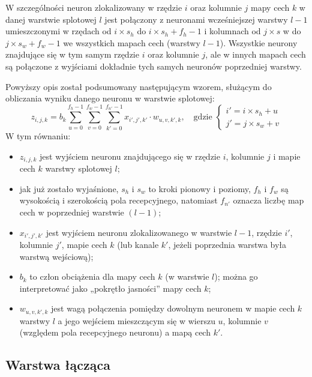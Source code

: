 \documentclass[12pt]{mwbk}
\theoremstyle{plain}
\theoremstyle{definition}
\theoremstyle{remark}
\begin{document}
W szczególności neuron zlokalizowany w rzędzie $i$ oraz kolumnie $j$ mapy cech $k$ w danej warstwie
splotowej $l$ jest połączony z neuronami wcześniejszej warstwy $l-1$ umieszczonymi w rzędach od $i\times s_h$
do $i\times s_h +f_h -1$ i kolumnach od $j\times s$ w do $j\times s_w +f_w -1$ we wszystkich mapach cech (warstwy $l-1$). Wszystkie neurony znajdujące się w tym samym rzędzie $i$ oraz kolumnie $j$, ale w innych
mapach cech są połączone z wyjściami dokładnie tych samych neuronów poprzedniej warstwy.



Powyższy opis został podsumowany następującym wzorem, służącym do obliczania wyniku danego neuronu w warstwie splotowej:
$$z_{i,j,k}=b_k\sum_{u=0}^{f_h-1}\sum_{v=0}^{f_w-1}\sum_{k'=0}^{f_{n'}-1}x_{i', j', k'} \cdot w_{u,v,k', k},\text{~~~gdzie }\begin{cases}
i'=i \times s_h+u\\
j'=j \times s_w+v
\end{cases}$$
W tym równaniu:
\begin{itemize}
	\item $z_{i,j,k}$ jest wyjściem neuronu znajdującego się w rzędzie $i$, kolumnie $j$ i mapie cech $k$ warstwy
	splotowej $l$;
	\item jak już zostało wyjaśnione, $s_h$ i $s_w$ to kroki pionowy i poziomy, $f_h$ i $f_w$ są wysokością i szerokością
	pola recepcyjnego, natomiast $f_{n'}$ oznacza liczbę map cech w poprzedniej warstwie $(l-1)$;
	\item $x_{i',j',k'}$ jest wyjściem neuronu zlokalizowanego w warstwie $l-1$, rzędzie $i'$, kolumnie $j'$, mapie
	cech $k$ (lub kanale $k'$, jeżeli poprzednia warstwa była warstwą wejściową);
	\item $b_k$ to człon obciążenia dla mapy cech $k$ (w warstwie $l$); można go interpretować jako „pokrętło
	jasności” mapy cech $k$;
	\item $w_{u,v,k',k}$ jest wagą połączenia pomiędzy dowolnym neuronem w mapie cech $k$ warstwy $l$ a jego
	wejściem mieszczącym się w wierszu $u$, kolumnie $v$ (względem pola recepcyjnego neuronu)
	a mapą cech $k'$.
\end{itemize}



\subsection{Warstwa łącząca}
\end{document}
